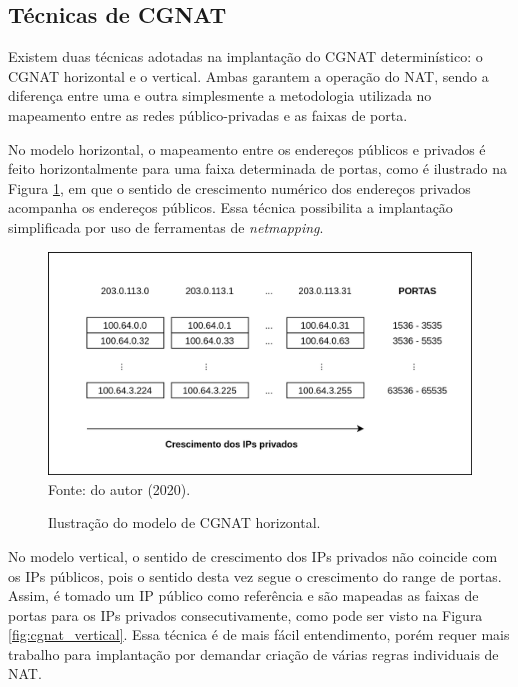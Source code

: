 \subsection{Técnicas de CGNAT}

    Existem duas técnicas adotadas na implantação do CGNAT determinístico: o CGNAT horizontal e o vertical. Ambas garantem a operação do NAT, sendo a diferença entre uma e outra simplesmente a metodologia utilizada no mapeamento entre as redes público-privadas e as faixas de porta.
    
    No modelo horizontal, o mapeamento entre os endereços públicos e privados é feito horizontalmente para uma faixa determinada de portas, como é ilustrado na Figura \ref{fig:cgnat_horizontal}, em que o sentido de crescimento numérico dos endereços privados acompanha os endereços públicos. Essa técnica possibilita a implantação simplificada por uso de ferramentas de \textit{netmapping}.
    
    \begin{figure}[!htb]
        \centering
        \caption{Ilustração do modelo de CGNAT horizontal.} 
        \label{fig:cgnat_horizontal} 
        \includegraphics[width=0.9\linewidth]{img/CGNAT-Horizontal.png} \\
        {\small Fonte: do autor (2020).} 
    \end{figure}
    
    No modelo vertical, o sentido de crescimento dos IPs privados não coincide com os IPs públicos, pois o sentido desta vez segue o crescimento do range de portas. Assim, é tomado um IP público como referência e são mapeadas as faixas de portas para os IPs privados consecutivamente, como pode ser visto na Figura \ref{fig:cgnat_vertical}. Essa técnica é de mais fácil entendimento, porém requer mais trabalho para implantação por demandar criação de várias regras individuais de NAT.
    
